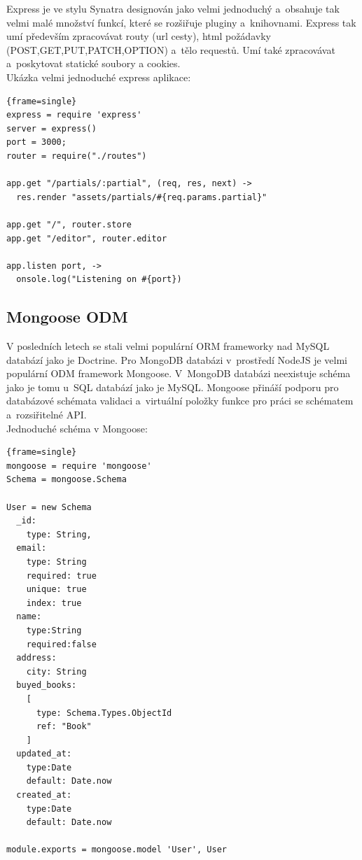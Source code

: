 \documentclass[a4paper,12pt,twoside,BCOR=10mm]{article}
\newenvironment{codeframe}{%
  \begin{Sbox} 
    \begin{minipage} 
      {\columnwidth-\leftmargin-\rightmargin-2\fboxsep-2\fboxrule-4pt} 
}{%

  \end{minipage} 
  \end{Sbox} 
  \begin{center} 
    \fcolorbox{black}{codeback}{\TheSbox} 
  \end{center} 
}
\begin{document}
Express je ve stylu Synatra designován jako velmi jednoduchý a~obsahuje tak velmi malé množství funkcí, které se rozšiřuje pluginy a~knihovnami. Express tak umí především zpracovávat routy (url cesty), html požádavky (POST,GET,PUT,PATCH,OPTION) a~tělo requestů. Umí také zpracovávat a~poskytovat statické soubory a cookies.\\

Ukázka velmi jednoduché express aplikace:
     \begin{codeframe} 
      \begin{Verbatim}{frame=single}
express = require 'express'
server = express()
port = 3000;
router = require("./routes")

app.get "/partials/:partial", (req, res, next) ->
  res.render "assets/partials/#{req.params.partial}"

app.get "/", router.store
app.get "/editor", router.editor

app.listen port, ->
  onsole.log("Listening on #{port})
\end{Verbatim} 
    \end{codeframe}

\subsection{Mongoose ODM}
V posledních letech se stali velmi populární ORM frameworky nad MySQL databází jako je Doctrine. Pro MongoDB databázi v~prostředí NodeJS je velmi populární ODM framework Mongoose. V~MongoDB databázi neexistuje schéma jako je tomu u~SQL databází jako je MySQL. Mongoose přináší podporu pro databázové schémata validaci a~virtuální položky funkce pro práci se schématem a~rozsiřitelné API. \\

Jednoduché schéma v Mongoose:
     \begin{codeframe} 
      \begin{Verbatim}{frame=single}
mongoose = require 'mongoose'
Schema = mongoose.Schema

User = new Schema
  _id:
    type: String,
  email:
    type: String
    required: true
    unique: true
    index: true
  name:
    type:String
    required:false
  address:
    city: String
  buyed_books:
    [
      type: Schema.Types.ObjectId
      ref: "Book"
    ]
  updated_at:
    type:Date
    default: Date.now
  created_at:
    type:Date
    default: Date.now

module.exports = mongoose.model 'User', User
\end{Verbatim} 
    \end{codeframe}
\end{document}
